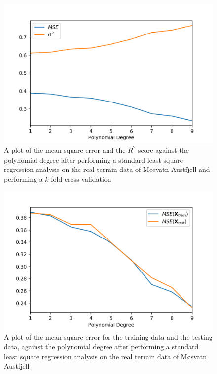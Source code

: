 \documentclass[a4paper,10pt,english]{article}
\begin{document}
\begin{figure}[H]
	\centering 
	\includegraphics[scale=0.7]{../real_output/part_B.png}
	\caption{
		A plot of the mean square error and the $R^2$-score against the polynomial degree after performing a standard least square regression analysis on the real terrain data of Møsvatn Austfjell and performing a $k$-fold cross-validation
	}
	\label{part_g_b}
\end{figure}


\begin{figure}[H]
	\centering 
	\includegraphics[scale=0.7]{../real_output/part_C_2.png}
	\caption{
		A plot of the mean square error for the training data and the testing data, against the polynomial degree after performing a standard least square regression analysis on the real terrain data of Møsvatn Austfjell
	}
	\label{part_g_c2}
\end{figure}
\end{document}
